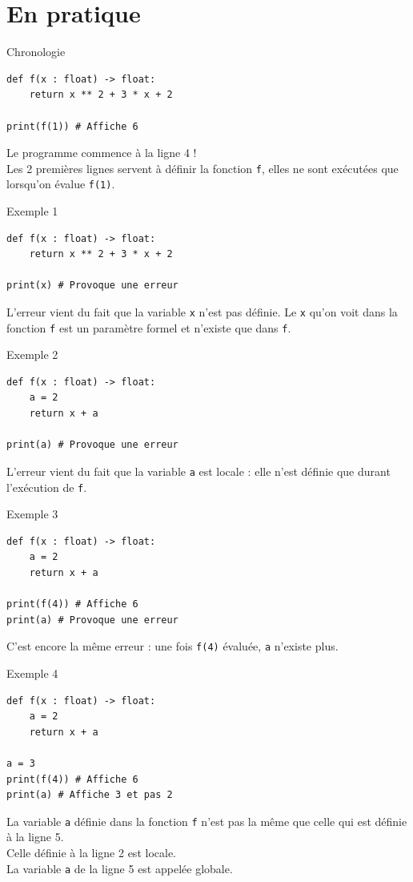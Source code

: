 \documentclass[10pt]{beamer}
\begin{document}
\section{En pratique}
\begin{frame}[fragile]{Chronologie}
    \begin{verbatim}
def f(x : float) -> float:
    return x ** 2 + 3 * x + 2

print(f(1)) # Affiche 6
    \end{verbatim}
    \pause
    Le programme commence à la ligne 4 !\\
    Les 2 premières lignes servent à définir la fonction \texttt{f}, elles ne sont exécutées que lorsqu'on évalue \texttt{f(1)}.
\end{frame}


\begin{frame}[fragile]{Exemple 1}
\begin{verbatim}
def f(x : float) -> float:
    return x ** 2 + 3 * x + 2

print(x) # Provoque une erreur
\end{verbatim}
\pause
L'erreur vient du fait que la variable \texttt{x} \alert{n'est pas définie}. Le \og \texttt{x} qu'on voit dans la fonction \texttt{f}\fg{} est un paramètre formel et n'existe que dans \texttt{f}.
\end{frame}

\begin{frame}[fragile]{Exemple 2}
    \begin{verbatim}
def f(x : float) -> float:
    a = 2
    return x + a

print(a) # Provoque une erreur
    \end{verbatim}
\pause
L'erreur vient du fait que la variable \texttt{a} \alert{est locale} : elle n'est définie que durant l'exécution de \texttt{f}.
\end{frame}
\begin{frame}[fragile]{Exemple 3}
    \begin{verbatim}
def f(x : float) -> float:
    a = 2
    return x + a

print(f(4)) # Affiche 6
print(a) # Provoque une erreur
    \end{verbatim}
\pause
C'est encore la même erreur : une fois \texttt{f(4)} évaluée, \texttt{a} n'existe plus.
\end{frame}

\begin{frame}[fragile]{Exemple 4}
    \begin{verbatim}
def f(x : float) -> float:
    a = 2
    return x + a

a = 3
print(f(4)) # Affiche 6
print(a) # Affiche 3 et pas 2
\end{verbatim}
\pause

La variable \texttt{a} définie dans la fonction \texttt{f} n'est pas la même que celle qui est définie à la ligne 5.\\
Celle définie à la ligne 2 est \alert{locale}.\\
La variable \texttt{a} de la ligne 5 est appelée \alert{globale}.
\end{frame}
\end{document}
